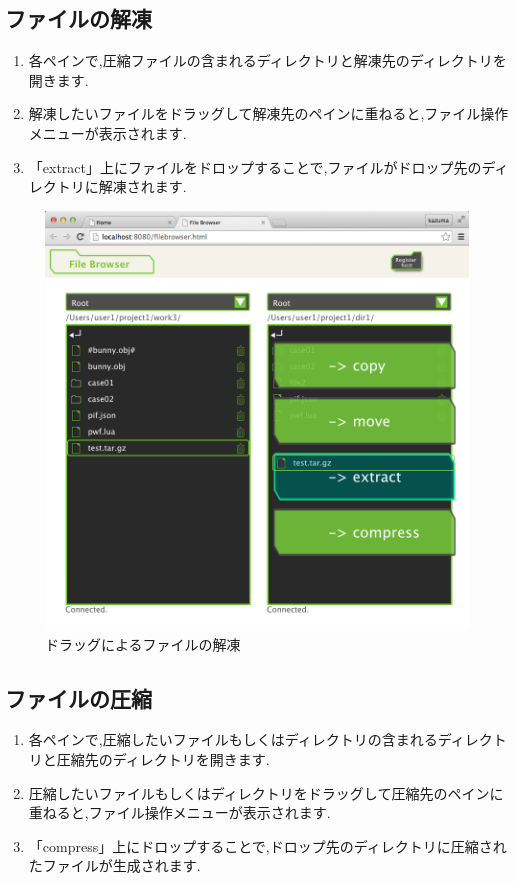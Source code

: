 \documentclass[a4paper,10pt,oneside]{jsbook}
\begin{document}
\newpage

\subsection{ファイルの解凍}
\begin{enumerate}
	\item 各ペインで,圧縮ファイルの含まれるディレクトリと解凍先のディレクトリを開きます.
	\item 解凍したいファイルをドラッグして解凍先のペインに重ねると,ファイル操作メニューが表示されます.
	\item 「extract」上にファイルをドロップすることで,ファイルがドロップ先のディレクトリに解凍されます.
\end{enumerate}

\begin{figure}[htbp]
	\begin{center}
		\includegraphics[width=12.0cm]{image/filebrowser_005.png}
	\end{center}
	\caption{ドラッグによるファイルの解凍}
	\label{fig:filebrowser_fileextract}
\end{figure}

\newpage

\subsection{ファイルの圧縮}
\begin{enumerate}
	\item 各ペインで,圧縮したいファイルもしくはディレクトリの含まれるディレクトリと圧縮先のディレクトリを開きます.
	\item 圧縮したいファイルもしくはディレクトリをドラッグして圧縮先のペインに重ねると,ファイル操作メニューが表示されます.
	\item「compress」上にドロップすることで,ドロップ先のディレクトリに圧縮されたファイルが生成されます.
\end{enumerate}
\end{document}
